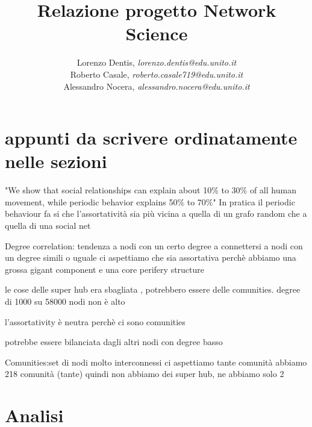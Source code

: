 \documentclass[a4paper]{article}
\begin{document}
\author{
	Lorenzo Dentis, \textit{lorenzo.dentis@edu.unito.it}\\
	Roberto Casale, \textit{roberto.casale719@edu.unito.it}\\
	Alessandro Nocera, \textit{alessandro.nocera@edu.unito.it}
}
\title{Relazione progetto Network Science}
\maketitle

\tableofcontents

\section{appunti da scrivere ordinatamente nelle sezioni}
"We show that social relationships can explain about 10\% to 30\% of all human movement, while periodic behavior explains 50\% to 70\%"
In pratica il periodic behaviour fa si che l'assortatività sia più vicina a quella di un grafo random che a quella di una social net



Degree correlation: tendenza a nodi con un certo degree a connettersi a nodi con un degree simili o uguale
ci aspettiamo che sia assortativa perchè abbiamo una grossa gigant component e una core perifery structure

le cose delle super hub era sbagliata , potrebbero essere delle comunities. degree di 1000 su 58000 nodi non è alto

l'assortativity è neutra perchè ci sono comunities


potrebbe essere bilanciata dagli altri nodi con degree basso


Comunities:set di nodi molto interconnessi
ci aspettiamo tante comunità
abbiamo 218 comunità (tante) quindi non abbiamo dei super hub, ne abbiamo solo 2

\section{Analisi}
\end{document}
